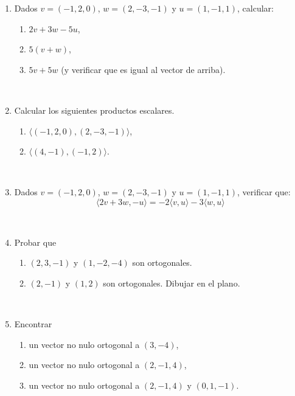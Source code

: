 \documentclass[a4paper,12pt,twoside,spanish,reqno]{amsbook}
\numberwithin{equation}{section}
\begin{document}
\begin{enumerate}


\item Dados $v = (-1, 2, 0)$, $w = (2,-3,-1)$ y $u = (1,-1,1)$, calcular:
\begin{enumerate}
	\item $2v + 3w -5u$,
	\item $5(v+w)$,
	\item $5v + 5w$ (y verificar que es igual al vector de arriba).
\end{enumerate}

\

\item Calcular los siguientes productos escalares. %
\begin{enumerate}
  \item $\langle (-1, 2, 0) ,(2,-3,-1) \rangle$,
  \item  $\langle (4,-1),(-1,2) \rangle$.
\end{enumerate}

\

\item Dados $v = (-1, 2, 0)$, $w = (2,-3,-1)$  y $u = (1,-1,1)$, verificar que:
\begin{equation*}
	\langle 2v + 3w , -u   \rangle = -2\langle v ,u \rangle -3 \langle w , u  \rangle
\end{equation*}

\

\item Probar  que
\begin{enumerate}
	\item $(2,3,-1)$ y $(1, -2, -4)$ son ortogonales.
	\item $(2,-1)$ y $(1,2)$ son ortogonales. Dibujar en el plano.
\end{enumerate}
\

\item Encontrar
\begin{enumerate}
	\item un vector no nulo ortogonal  a $(3,-4)$,
	\item un vector no nulo ortogonal a $(2,-1,4)$,
	\item un vector no nulo ortogonal a $(2,-1,4)$ y $(0,1,-1)$.
\end{enumerate}


\end{enumerate}
\end{document}
